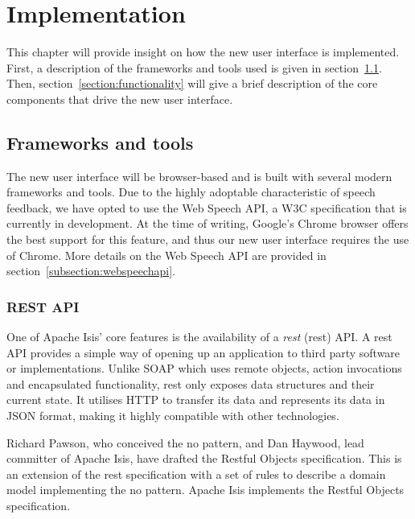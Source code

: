 \chapter{Implementation}
\label{chapter:implementation}
This chapter will provide insight on how the new user interface is implemented. First, a description of the frameworks and tools used is given in section~\ref{section:frameworkandtools}. Then, section~\ref{section:functionality} will give a brief description of the core components that drive the new user interface.

\section{Frameworks and tools}
\label{section:frameworkandtools}
The new user interface will be browser-based and is built with several modern frameworks and tools. Due to the highly adoptable characteristic of speech feedback, we have opted to use the Web Speech API, a W3C specification that is currently in development. At the time of writing, Google's Chrome browser offers the best support for this feature, and thus our new user interface requires the use of Chrome. More details on the Web Speech API are provided in section~\ref{subsection:webspeechapi}.

\subsection{REST API}
\label{subsection:restapi}
One of Apache Isis' core features is the availability of a \textit{\acrlong{rest}} (\acrshort{rest}) API. A \acrshort{rest} API provides a simple way of opening up an application to third party software or implementations. Unlike SOAP which uses remote objects, action invocations and encapsulated functionality, \acrshort{rest} only exposes data structures and their current state\cite{battle2008bridging}. It utilises HTTP to transfer its data and represents its data in JSON format, making it highly compatible with other technologies.

Richard Pawson, who conceived the \acrshort{no}  pattern, and Dan Haywood, lead committer of Apache Isis, have drafted the Restful Objects specification. This is an extension of the \acrshort{rest} specification with a set of rules to describe a domain model implementing the \acrshort{no} pattern\cite{Restf62:online}. Apache Isis implements the Restful Objects specification.

